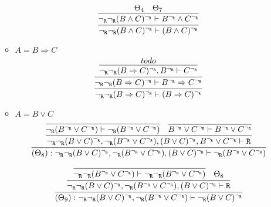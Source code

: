 \begin{enumerate}[(i)]
\begin{itemize}
            $$
                \infer{
                    \neg_\R\neg_\R(B \wedge C)^{\neg_\R} \vdash (B \wedge C)^{\neg_\R}
                }{
                    \infer{
                        \neg_\R\neg_\R(B \wedge C)^{\neg_\R} \vdash B^{\neg_\R} \wedge C^{\neg_\R}
                    }{
                        \Theta_4
                        &
                        \Theta_7
                    }
                }
            $$
        \item $A=B \Rightarrow C$
            $$
                \infer{
                    \neg_\R\neg_\R (B \Rightarrow C)^{\neg_\R} \vdash (B \Rightarrow C)^{\neg_\R}
                }{
                    \infer{
                        \neg_\R\neg_\R (B \Rightarrow C)^{\neg_\R} \vdash B^{\neg_\R} \Rightarrow C^{\neg_\R}
                    }{
                        \infer{
                            \neg_\R\neg_\R (B \Rightarrow C)^{\neg_\R}, B^{\neg_\R} \vdash C^{\neg_\R}
                        }{
                            todo
                        }
                    }
                }
            $$
        \item $A=B \vee C$
            $$            
                    \infer{
                        (\Theta_8) : \neg_\R\neg_\R(B \vee C)^{\neg_\R}, \neg_\R(B^{\neg_\R} \vee C^{\neg_\R}), (B \vee C)^{\neg_\R} \vdash \neg_\R(B^{\neg_\R} \vee C^{\neg_\R})
                    }{
                        \infer{
                            \neg_\R\neg_\R(B \vee C)^{\neg_\R}, \neg_\R(B^{\neg_\R} \vee C^{\neg_\R}), (B \vee C)^{\neg_\R}, B^{\neg_\R} \vee C^{\neg_\R} \vdash \R
                        }{
                            \infer{
                                \neg_\R(B^{\neg_\R} \vee C^{\neg_\R}) \vdash \neg_\R(B^{\neg_\R} \vee C^{\neg_\R})
                            }{
                            }&
                            \infer{
                                B^{\neg_\R} \vee C^{\neg_\R} \vdash B^{\neg_\R} \vee C^{\neg_\R}
                            }{
                            }
                        }
                    }
            $$
            
            $$
            \infer{
                (\Theta_9) : \neg_\R\neg_\R(B \vee C)^{\neg_\R}, \neg_\R(B^{\neg_\R} \vee C^{\neg_\R}) \vdash \neg_\R(B \vee C)^{\neg_\R}
            }{
                \infer{
                    \neg_\R\neg_\R(B \vee C)^{\neg_\R}, \neg_\R(B^{\neg_\R} \vee C^{\neg_\R}), (B \vee C)^{\neg_\R} \vdash \R
                }{
                    \infer{
                        \neg_\R\neg_\R(B^{\neg_\R} \vee C^{\neg_\R}) \vdash \neg_\R\neg_\R(B^{\neg_\R} \vee C^{\neg_\R})
                    }{
                    }&
                    \Theta_8
                }
            }
            $$
        

\end{itemize}
\end{enumerate}
